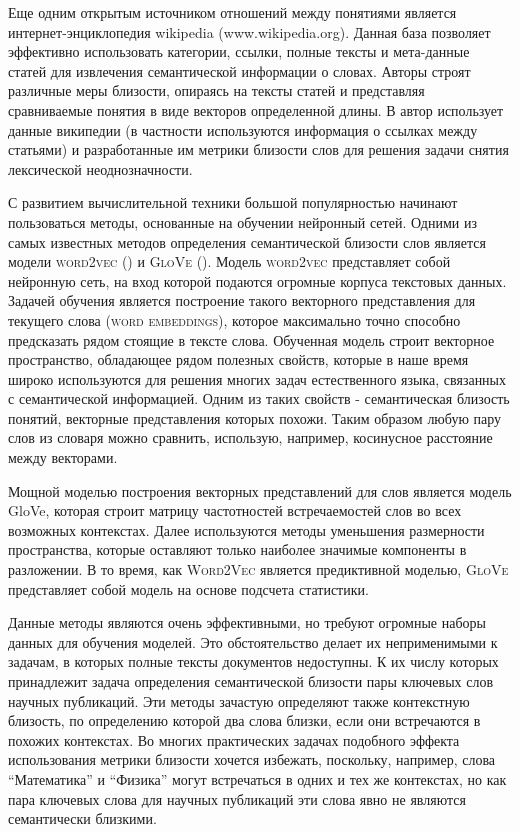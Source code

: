 Еще одним открытым источником отношений между понятиями является интернет-энциклопедия wikipedia (www.wikipedia.org). Данная база позволяет эффективно использовать категории, ссылки, полные тексты и мета-данные статей для извлечения семантической информации о словах. Авторы \cite{wiki} строят различные меры близости, опираясь на тексты статей и представляя сравниваемые понятия в виде векторов определенной длины. В \cite{wiki_2} автор использует данные википедии (в частности используются информация о ссылках между статьями) и разработанные им метрики близости слов для решения задачи снятия лексической неоднозначности. 

С развитием вычислительной техники большой популярностью начинают пользоваться методы, основанные на обучении нейронный сетей. Одними из самых известных методов определения семантической близости слов является модели \textsc{word2vec} (\cite{word2vec}) и \textsc{GloVe} (\cite{glove}). Модель \textsc{word2vec} представляет собой нейронную сеть, на вход которой подаются огромные корпуса текстовых данных. Задачей обучения является построение такого векторного представления для текущего слова (\textsc{word embeddings}), которое максимально точно способно предсказать рядом стоящие в тексте слова. Обученная модель строит векторное пространство, обладающее рядом полезных свойств, которые в наше время широко используются для решения многих задач естественного языка, связанных с семантической информацией. Одним из таких свойств - семантическая близость понятий, векторные представления которых похожи. Таким образом любую пару слов из словаря можно сравнить, использую, например, косинусное расстояние между векторами.

Мощной моделью построения векторных представлений для слов является модель GloVe, которая строит матрицу частотностей встречаемостей слов во всех возможных контекстах. Далее используются методы уменьшения размерности пространства, которые оставляют только наиболее значимые компоненты в разложении. В то время, как \textsc{Word2Vec} является предиктивной моделью, \textsc{GloVe} представляет собой модель на основе подсчета статистики.

Данные методы являются очень эффективными, но требуют огромные наборы данных для обучения моделей. Это обстоятельство делает их неприменимыми к задачам, в которых полные тексты документов недоступны. К их числу которых принадлежит задача определения семантической близости пары ключевых слов научных публикаций. Эти методы зачастую определяют также контекстную близость, по определению которой два слова близки, если они встречаются в похожих контекстах. Во многих практических задачах подобного эффекта использования метрики близости хочется избежать, поскольку, например, слова “Математика” и “Физика” могут встречаться в одних и тех же контекстах, но как пара ключевых слова для научных публикаций эти слова явно не являются  семантически близкими.


